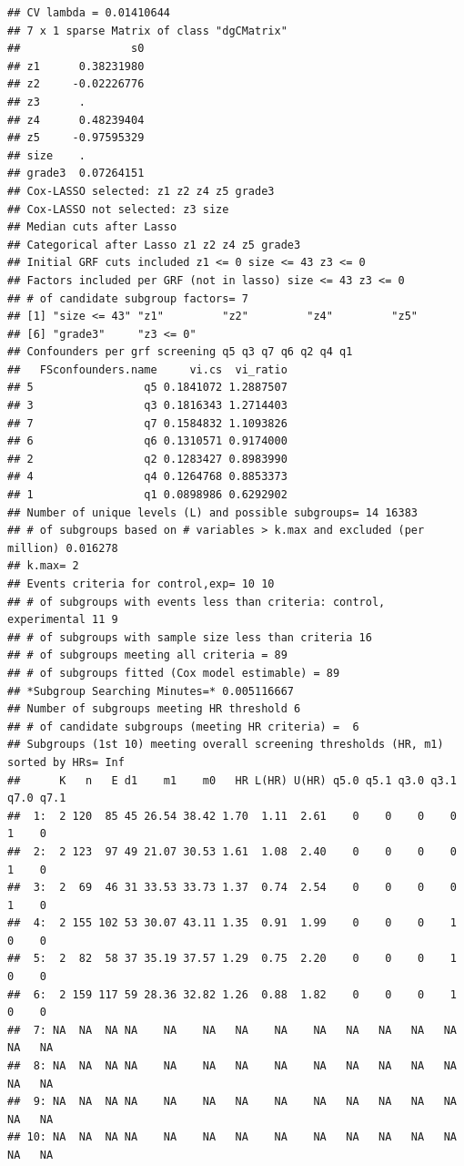 \documentclass[smallextended]{svjour3}
\makeatletter
\newenvironment{kframe}{%
 \def\at@end@of@kframe{}%
 \ifinner\ifhmode%
  \def\at@end@of@kframe{\end{minipage}}%
  \begin{minipage}{\columnwidth}%
 \fi\fi%
 \def\FrameCommand##1{\hskip\@totalleftmargin \hskip-\fboxsep
 \colorbox{shadecolor}{##1}\hskip-\fboxsep
     \hskip-\linewidth \hskip-\@totalleftmargin \hskip\columnwidth}%
 \MakeFramed {\advance\hsize-\width
   \@totalleftmargin\z@ \linewidth\hsize
   \@setminipage}}%
 {\par\unskip\endMakeFramed%
 \at@end@of@kframe}
\newenvironment{knitrout}{}{} %
\makeatother
\begin{document}
\begin{knitrout}
\begin{kframe}
\begin{verbatim}
## CV lambda = 0.01410644 
## 7 x 1 sparse Matrix of class "dgCMatrix"
##                 s0
## z1      0.38231980
## z2     -0.02226776
## z3      .         
## z4      0.48239404
## z5     -0.97595329
## size    .         
## grade3  0.07264151
## Cox-LASSO selected: z1 z2 z4 z5 grade3 
## Cox-LASSO not selected: z3 size 
## Median cuts after Lasso 
## Categorical after Lasso z1 z2 z4 z5 grade3 
## Initial GRF cuts included z1 <= 0 size <= 43 z3 <= 0 
## Factors included per GRF (not in lasso) size <= 43 z3 <= 0 
## # of candidate subgroup factors= 7 
## [1] "size <= 43" "z1"         "z2"         "z4"         "z5"        
## [6] "grade3"     "z3 <= 0"   
## Confounders per grf screening q5 q3 q7 q6 q2 q4 q1 
##   FSconfounders.name     vi.cs  vi_ratio
## 5                 q5 0.1841072 1.2887507
## 3                 q3 0.1816343 1.2714403
## 7                 q7 0.1584832 1.1093826
## 6                 q6 0.1310571 0.9174000
## 2                 q2 0.1283427 0.8983990
## 4                 q4 0.1264768 0.8853373
## 1                 q1 0.0898986 0.6292902
## Number of unique levels (L) and possible subgroups= 14 16383 
## # of subgroups based on # variables > k.max and excluded (per million) 0.016278 
## k.max= 2 
## Events criteria for control,exp= 10 10 
## # of subgroups with events less than criteria: control, experimental 11 9 
## # of subgroups with sample size less than criteria 16 
## # of subgroups meeting all criteria = 89 
## # of subgroups fitted (Cox model estimable) = 89 
## *Subgroup Searching Minutes=* 0.005116667 
## Number of subgroups meeting HR threshold 6 
## # of candidate subgroups (meeting HR criteria) =  6 
## Subgroups (1st 10) meeting overall screening thresholds (HR, m1) sorted by HRs= Inf 
##      K   n   E d1    m1    m0   HR L(HR) U(HR) q5.0 q5.1 q3.0 q3.1 q7.0 q7.1
##  1:  2 120  85 45 26.54 38.42 1.70  1.11  2.61    0    0    0    0    1    0
##  2:  2 123  97 49 21.07 30.53 1.61  1.08  2.40    0    0    0    0    1    0
##  3:  2  69  46 31 33.53 33.73 1.37  0.74  2.54    0    0    0    0    1    0
##  4:  2 155 102 53 30.07 43.11 1.35  0.91  1.99    0    0    0    1    0    0
##  5:  2  82  58 37 35.19 37.57 1.29  0.75  2.20    0    0    0    1    0    0
##  6:  2 159 117 59 28.36 32.82 1.26  0.88  1.82    0    0    0    1    0    0
##  7: NA  NA  NA NA    NA    NA   NA    NA    NA   NA   NA   NA   NA   NA   NA
##  8: NA  NA  NA NA    NA    NA   NA    NA    NA   NA   NA   NA   NA   NA   NA
##  9: NA  NA  NA NA    NA    NA   NA    NA    NA   NA   NA   NA   NA   NA   NA
## 10: NA  NA  NA NA    NA    NA   NA    NA    NA   NA   NA   NA   NA   NA   NA

\end{verbatim}
\end{kframe}
\end{knitrout}
\end{document}
